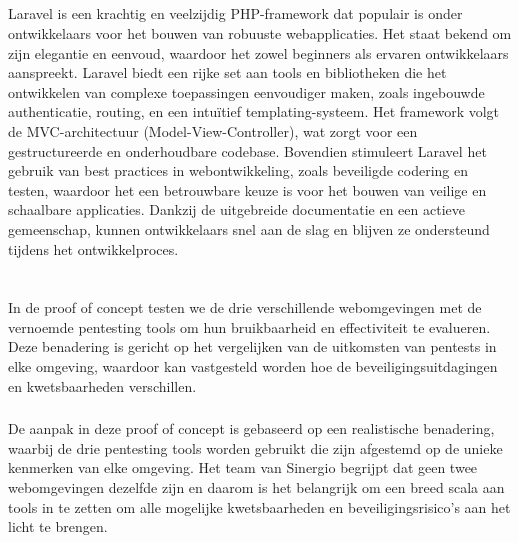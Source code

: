 \subsection{}
Laravel is een krachtig en veelzijdig PHP-framework dat populair is onder ontwikkelaars voor het bouwen van robuuste 
webapplicaties. Het staat bekend om zijn elegantie en eenvoud, waardoor het zowel beginners als ervaren ontwikkelaars 
aanspreekt. Laravel biedt een rijke set aan tools en bibliotheken die het ontwikkelen van complexe toepassingen eenvoudiger 
maken, zoals ingebouwde authenticatie, routing, en een intuïtief templating-systeem. Het framework volgt de MVC-architectuur 
(Model-View-Controller), wat zorgt voor een gestructureerde en onderhoudbare codebase. Bovendien stimuleert Laravel het 
gebruik van best practices in webontwikkeling, zoals beveiligde codering en testen, waardoor het een betrouwbare keuze is 
voor het bouwen van veilige en schaalbare applicaties. Dankzij de uitgebreide documentatie en een actieve gemeenschap, kunnen 
ontwikkelaars snel aan de slag en blijven ze ondersteund tijdens het ontwikkelproces.


\section{}

In de proof of concept testen we de drie verschillende webomgevingen met de vernoemde pentesting tools om hun bruikbaarheid en effectiviteit te evalueren. 
Deze benadering is gericht op het vergelijken van de uitkomsten van pentests in elke omgeving, waardoor kan vastgesteld worden hoe de 
beveiligingsuitdagingen en kwetsbaarheden verschillen.

\subsubsection{}
De aanpak in deze proof of concept is gebaseerd op een realistische benadering, waarbij de drie pentesting tools worden gebruikt die zijn afgestemd 
op de unieke kenmerken van elke omgeving. Het team van Sinergio begrijpt dat geen twee webomgevingen dezelfde zijn en daarom is het belangrijk om een breed scala 
aan tools in te zetten om alle mogelijke kwetsbaarheden en beveiligingsrisico's aan het licht te brengen.

